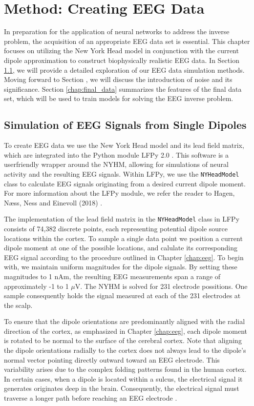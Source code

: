 \documentclass[a4paper, UKenglish, 11pt]{uiomaster}
\begin{document}
\chapter{Method: Creating EEG Data} \label{chap:eeg_data}
In preparation for the application of neural networks to address the inverse problem, the acquisition of an appropriate EEG data set is essential. This chapter focuses on utilizing the New York Head model in conjunction with the current dipole approximation to construct biophysically realistic EEG data.
In Section \ref{chap:simulation}, we will provide a detailed exploration of our EEG data simulation methods. Moving forward to Section \label{chap:noise}, we will discuss the introduction of noise and its significance. Section \ref{chap:final_data} summarizes the features of the final data set, which will be used to train models for solving the EEG inverse problem.


\section{Simulation of EEG Signals from Single Dipoles} \label{chap:simulation}
To create EEG data we use the New York Head model and its lead field matrix, which are integrated into the Python module LFPy 2.0 \cite{LFPy}. This software is a userfriendly wrapper around the NYHM, allowing for simulations of neural activity and the resulting EEG signals. Within LFPy, we use the \texttt{NYHeadModel} class to calculate EEG signals originating from a desired current dipole moment. For more information about the LFPy module, we refer the reader to Hagen, Næss, Ness and Einevoll (2018) \cite{LFPy}.

The implementation of the lead field matrix in the \texttt{NYHeadModel} class in LFPy consists of 74,382 discrete points, each representing potential dipole source locations within the cortex. To sample a single data point we position a current dipole moment at one of the possible locations, and calulate its corresponding EEG signal according to the procedure outlined in Chapter \ref{chap:eeg}. To begin with, we maintain uniform magnitudes for the dipole signals. By setting these magnitudes to 1 nAm, the resulting EEG measurements span a range of approximately -1 to 1 $\mu$V. The NYHM is solved for 231 electrode possitions. One sample consequently holds the signal measured at each of the 231 electrodes at the scalp.

To ensure that the dipole orientations are predominantly aligned with the radial direction of the cortex, as emphasized in Chapter \ref{chap:eeg}, each dipole moment is rotated to be normal to the surface of the cerebral cortex. Note that aligning the dipole orientations radially to the cortex does not always lead to the dipole's normal vector pointing directly outward toward an EEG electrode. This variability arises due to the complex folding patterns found in the human cortex. In certain cases, when a dipole is located within a sulcus, the electrical signal it generates originates deep in the brain. Consequently, the electrical signal must traverse a longer path before reaching an EEG electrode \cite{naess2021biophysically}.
\end{document}
